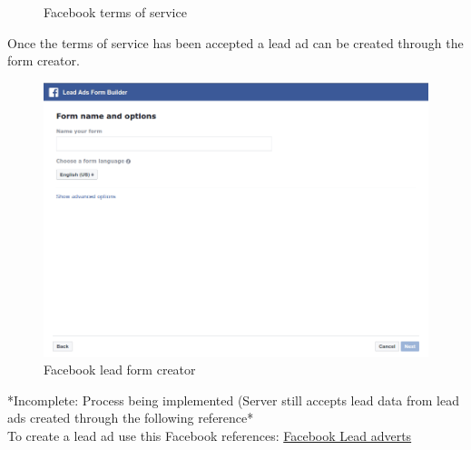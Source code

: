 \documentclass{article}
\begin{document}
\begin{enumerate}
\begin{figure}[H]
					\caption{Facebook terms of service}
					\label{fig:facebookTermsOfService}
				\end{figure}
				Once the terms of service has been accepted a lead ad can be created through the form creator.\\
				\begin{figure}[H]
					\centering
						\includegraphics[width=\textwidth]{images/facebook_lead_form_creator.png}
					\caption{Facebook lead form creator}
					\label{fig:facebookLeadFormCreator}
				\end{figure}
				*Incomplete: Process being implemented (Server still accepts lead data from lead ads created through the following reference*\\
				To create a lead ad use this Facebook references: \href{https://www.facebook.com/business/a/lead-ads}{Facebook Lead adverts}
			\end{enumerate}

\end{document}
